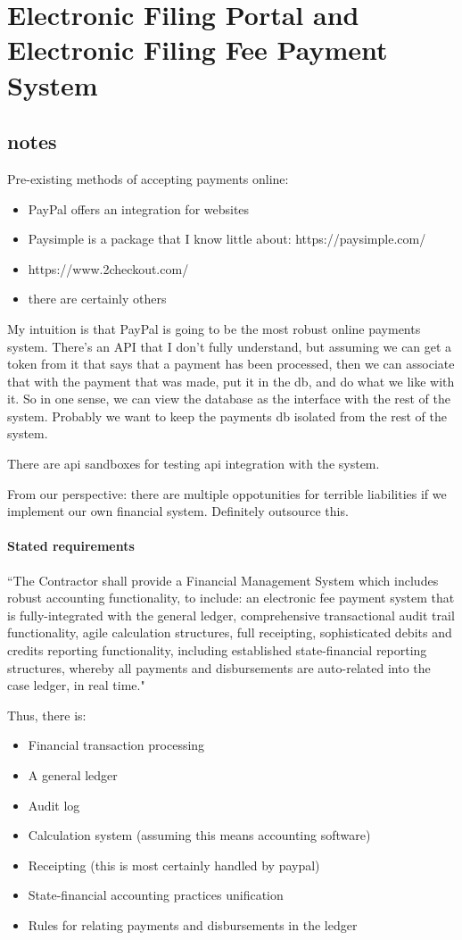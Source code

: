 \section{Electronic Filing Portal and Electronic Filing Fee Payment System}
\subsection{notes}

Pre-existing methods of accepting payments online:
\begin{itemize}
	\item PayPal offers an integration for websites
	\item Paysimple is a package that I know little about: https://paysimple.com/
	\item https://www.2checkout.com/
	\item there are certainly others
\end{itemize}

My intuition is that PayPal is going to be the most robust online payments
system.  There's an API that I don't fully understand, but assuming we can get
a token from it that says that a payment has been processed, then we can
associate that with the payment that was made, put it in the db, and do what we
like with it.  So in one sense, we can view the database as the interface with
the rest of the system.  Probably we want to keep the payments db isolated from
the rest of the system.

There are api sandboxes for testing api integration with the system.

From our perspective: there are multiple oppotunities for terrible liabilities
if we implement our own financial system.  Definitely outsource this.

\paragraph{Stated requirements} ``The Contractor shall provide a Financial
Management System which includes robust accounting functionality, to include:
an electronic fee payment system that is fully-integrated with the general
ledger, comprehensive transactional audit trail functionality, agile
calculation structures, full receipting, sophisticated debits and credits
reporting functionality, including established state-financial reporting
structures, whereby all payments and disbursements are auto-related into the
case ledger, in real time."

Thus, there is:
\begin{itemize}
	\item Financial transaction processing
	\item A general ledger
	\item Audit log
	\item Calculation system (assuming this means accounting software)
	\item Receipting (this is most certainly handled by paypal)
	\item State-financial accounting practices unification
	\item Rules for relating payments and disbursements in the ledger
\end{itemize}

